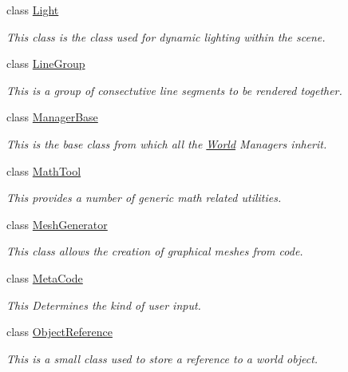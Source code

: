 \begin{DoxyCompactItemize}
class \hyperlink{classphys_1_1Light}{Light}
\begin{DoxyCompactList}\small\item\em This class is the class used for dynamic lighting within the scene. \item\end{DoxyCompactList}\item 
class \hyperlink{classphys_1_1LineGroup}{LineGroup}
\begin{DoxyCompactList}\small\item\em This is a group of consectutive line segments to be rendered together. \item\end{DoxyCompactList}\item 
class \hyperlink{classphys_1_1ManagerBase}{ManagerBase}
\begin{DoxyCompactList}\small\item\em This is the base class from which all the \hyperlink{classphys_1_1World}{World} Managers inherit. \item\end{DoxyCompactList}\item 
class \hyperlink{classphys_1_1MathTool}{MathTool}
\begin{DoxyCompactList}\small\item\em This provides a number of generic math related utilities. \item\end{DoxyCompactList}\item 
class \hyperlink{classphys_1_1MeshGenerator}{MeshGenerator}
\begin{DoxyCompactList}\small\item\em This class allows the creation of graphical meshes from code. \item\end{DoxyCompactList}\item 
class \hyperlink{classphys_1_1MetaCode}{MetaCode}
\begin{DoxyCompactList}\small\item\em This Determines the kind of user input. \item\end{DoxyCompactList}\item 
class \hyperlink{classphys_1_1ObjectReference}{ObjectReference}
\begin{DoxyCompactList}\small\item\em This is a small class used to store a reference to a world object. \item\end{DoxyCompactList}\item 

\end{DoxyCompactItemize}
